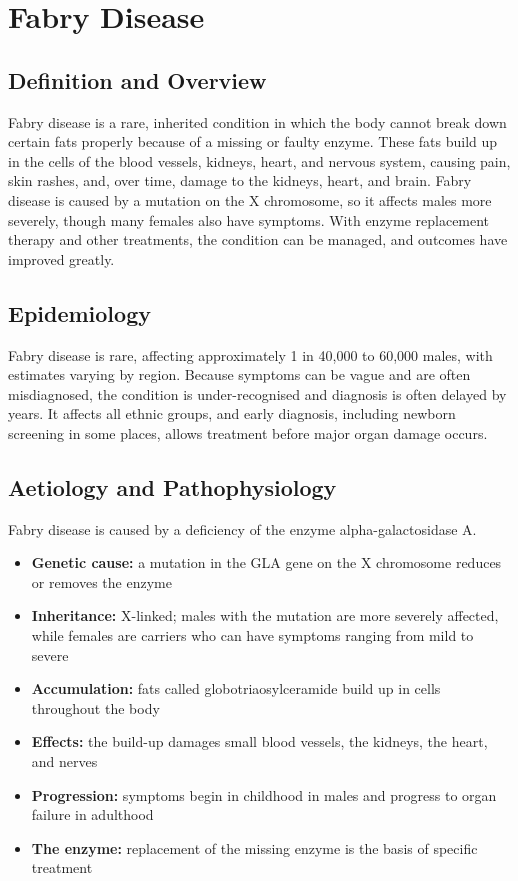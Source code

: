 \chapter{Fabry Disease}

\section*{Definition and Overview}
Fabry disease is a rare, inherited condition in which the body cannot break down certain fats properly because of a missing or faulty enzyme. These fats build up in the cells of the blood vessels, kidneys, heart, and nervous system, causing pain, skin rashes, and, over time, damage to the kidneys, heart, and brain. Fabry disease is caused by a mutation on the X chromosome, so it affects males more severely, though many females also have symptoms. With enzyme replacement therapy and other treatments, the condition can be managed, and outcomes have improved greatly.

\section*{Epidemiology}
Fabry disease is rare, affecting approximately 1 in 40,000 to 60,000 males, with estimates varying by region. Because symptoms can be vague and are often misdiagnosed, the condition is under-recognised and diagnosis is often delayed by years. It affects all ethnic groups, and early diagnosis, including newborn screening in some places, allows treatment before major organ damage occurs.

\section*{Aetiology and Pathophysiology}
Fabry disease is caused by a deficiency of the enzyme alpha-galactosidase A.
\begin{itemize}
    \item \textbf{Genetic cause:} a mutation in the GLA gene on the X chromosome reduces or removes the enzyme
    \item \textbf{Inheritance:} X-linked; males with the mutation are more severely affected, while females are carriers who can have symptoms ranging from mild to severe
    \item \textbf{Accumulation:} fats called globotriaosylceramide build up in cells throughout the body
    \item \textbf{Effects:} the build-up damages small blood vessels, the kidneys, the heart, and nerves
    \item \textbf{Progression:} symptoms begin in childhood in males and progress to organ failure in adulthood
    \item \textbf{The enzyme:} replacement of the missing enzyme is the basis of specific treatment
\end{itemize}


